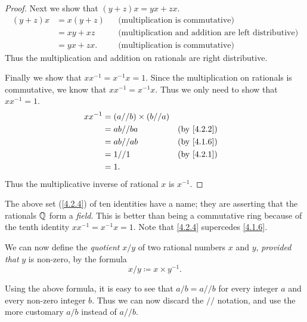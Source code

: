 \begin{proof}
  Next we show that \((y + z)x = yx + zx\).
  \begin{align*}
    (y + z)x & = x(y + z) &  & \text{(multiplication is commutative)}                     \\
             & = xy + xz  &  & \text{(multiplication and addition are left distributive)} \\
             & = yx + zx. &  & \text{(multiplication is commutative)}
  \end{align*}
  Thus the multiplication and addition on rationals are right distributive.

  Finally we show that \(xx^{-1} = x^{-1}x = 1\).
  Since the multiplication on rationals is commutative, we know that \(xx^{-1} = x^{-1}x\).
  Thus we only need to show that \(xx^{-1} = 1\).
  \begin{align*}
    xx^{-1} & = (a // b) \times (b // a)                 \\
            & = ab // ba                 &  & \by{4.2.2} \\
            & = ab // ab                 &  & \by{4.1.6} \\
            & = 1 // 1                   &  & \by{4.2.1} \\
            & = 1.
  \end{align*}
  Thus the multiplicative inverse of rational \(x\) is \(x^{-1}\).
\end{proof}

\begin{rmk}\label{4.2.5}
  The above set (\cref{4.2.4}) of ten identities have a name;
  they are asserting that the rationals \(\mathbb{Q}\) form a \emph{field}.
  This is better than being a commutative ring because of the tenth identity \(xx^{-1} = x^{-1}x = 1\).
  Note that \cref{4.2.4} supercedes \cref{4.1.6}.
\end{rmk}

\begin{note}
  We can now define the \emph{quotient} \(x / y\) of two rational numbers \(x\) and \(y\), \emph{provided that} \(y\) is non-zero, by the formula
  \[
    x / y \coloneqq x \times y^{-1}.
  \]
\end{note}

\begin{note}
  Using the above formula, it is easy to see that \(a / b = a // b\) for every integer \(a\) and every non-zero integer \(b\).
  Thus we can now discard the \(//\) notation, and use the more customary \(a / b\) instead of \(a // b\).
\end{note}

